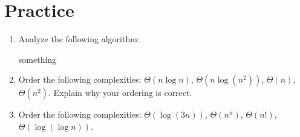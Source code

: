 \documentclass[main.tex]{subfiles}
\begin{document}
\section{Practice}

\begin{enumerate}
	\item Analyze the following algorithm:
	\begin{algorithmic}[1]
			\State something
		\EndFunction
	\end{algorithmic}
	\item Order the following complexities: \(\Theta(n \log n)\), \(\Theta(n \log (n^2))\), \(\Theta(n)\), \(\Theta(n^2)\). Explain why your ordering is correct.
	\item Order the following complexities: \(\Theta(\log (3n))\), \(\Theta(n^n)\), \(\Theta(n!)\), \(\Theta(\log (\log n))\).
\end{enumerate}

%
\end{document}
